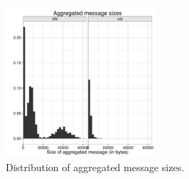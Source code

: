 \begin{figure}[ht]
    \begin{center}
      \includegraphics[width=0.5\textwidth]{results/histograms/rdma_bytes_sent_histogram_cmb.pdf}
    \end{center}
    \caption{Distribution of aggregated message sizes.}
    \label{fig:grappa-message-size}
\end{figure}




















